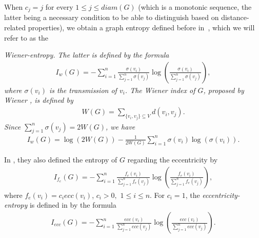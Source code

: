 \documentclass{article}
\newcommand{\diam}{diam}
\begin{document}
When $c_j=j$ for every $1 \le j \le \diam(G)$ (which is a monotonic sequence, the latter being a necessary condition to be able to distinguish based on distance-related properties), we obtain a graph entropy defined before in~\cite{AL11}, which we will refer to as the {\em Wiener-entropy.
The latter is defined by the formula
\begin{align*}
I_{w}(G)=-\sum_{i=1}^{n}\frac{\sigma(v_i)}{\sum_{j=1}^{n}\sigma(v_j)}\log\left(\frac{\sigma(v_i)}{\sum_{j=1}^{n}\sigma(v_j)}\right),
\end{align*}
where $\sigma(v_i)$ is the transmission of $v_i$. 
The {\em Wiener index} of $G$, proposed by Wiener \cite{Wiener1193a005}, is defined by
\begin{align*}
W(G)=\sum\limits_{\{v_i,v_j\}\subseteq V} d(v_i,v_j).
\end{align*}
Since $\sum_{j=1}^{n}\sigma(v_j)=2W(G)$, we have
\begin{align*}
I_{w}(G)=\log(2W(G))-\frac{1}{2W(G)}\sum_{i=1}^{n}\sigma(v_i)\log(\sigma(v_i)).
\end{align*}

In \cite{Dehmer_Kraus,KDM13}, they also defined the entropy of $G$ regarding the eccentricity by
\begin{align*}
I_{f_{e}}(G)=-\sum_{i=1}^{n}\frac{f_{e}(v_i)}{\sum_{j=1}^{n}f_{e}(v_j)}\log \left(\frac{f_{e}(v_i)}{\sum_{j=1}^{n}f_{e}(v_j)}\right),
\end{align*}
where $f_{e}(v_i)=c_iecc(v_i)$, $c_i>0,$ $1 \leq i\leq n$. 
For $c_i=1$,
the {\em eccentricity-entropy} is defined in \cite{Dehmer_Kraus,KDM13} by the formula
\begin{align*}
I_{ecc}(G)=-\sum_{i=1}^{n}\frac{ecc(v_i)}{\sum_{j=1}^{n}ecc(v_j)}\log\left(\frac{ecc(v_i)}{\sum_{j=1}^{n}ecc(v_j)}\right).
\end{align*}
















}
\end{document}
